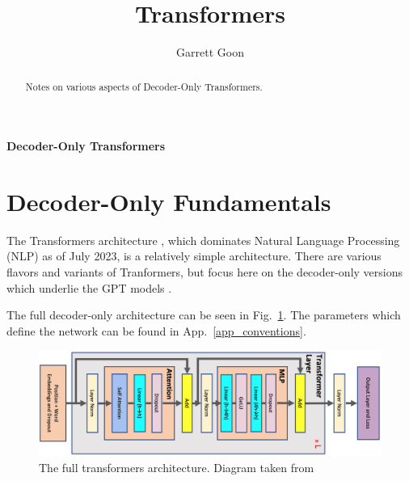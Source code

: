 \documentclass[11pt]{article}
\title{Transformers}
\author{Garrett Goon}
\begin{document}
%

\vspace{1truecm}
%
%
\renewcommand{\thefootnote}{\fnsymbol{footnote}}
\begin{center}
{\huge \bf{Decoder-Only Transformers}}
\end{center}


\begin{abstract}

Notes on various aspects of Decoder-Only Transformers.

\end{abstract}

\tableofcontents


\renewcommand*{\thefootnote}{\arabic{footnote}}
\setcounter{footnote}{0}



\section{Decoder-Only Fundamentals \label{sec_decoder_only} }

The Transformers architecture \cite {vaswani2017attention}, which dominates Natural Language
Processing (NLP) as of July 2023, is a relatively simple architecture. There are various flavors and
variants of Tranformers, but focus here on the decoder-only versions which underlie the
GPT models \cite {gpt2radford2019language, gpt3brown2020language, gpt4openai2023}.

The full decoder-only architecture can be seen in Fig.~\ref{fig:transformers_architecture}. The
parameters which define the network can be found in App.~\ref{app_conventions}.
\begin{figure}[h]
    \centering
    \includegraphics[scale=0.28]{figures/transformer-general.jpg}
    \caption{The full transformers architecture. Diagram taken from \cite{korthikanti2022reducing} }
    \label{fig:transformers_architecture}
\end{figure}
\end{document}
